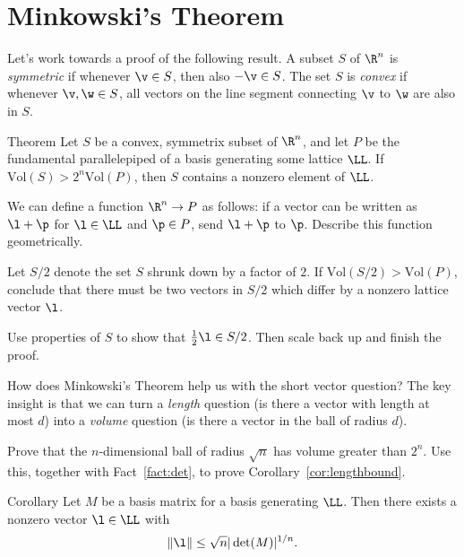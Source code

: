 \section*{Minkowski's Theorem}

Let's work towards a proof of the following result. A subset $S$ of $\R^n$ is \emph{symmetric} if whenever $\v\in S$, then also $-\v\in S$. The set $S$ is \emph{convex} if whenever $\v,\w\in S$, all vectors on the line segment connecting $\v$ to $\w$ are also in $S$.

\begin{toprove}{Theorem}\label{thm:minkowski}
	Let $S$ be a convex, symmetrix subset of $\R^n$, and let $P$ be the fundamental parallelepiped of a basis generating some lattice $\LL$. If $\text{Vol}(S)>2^n\text{Vol}(P)$, then $S$ contains a nonzero element of $\LL$.
\end{toprove}

\begin{explor}
	We can define a function $\R^n\to P$ as follows: if a vector can be written as $\l+\p$ for $\l\in\LL$ and $\p\in P$, send $\l+\p$ to $\p$. Describe this function geometrically.
\end{explor}

\begin{explor}
	Let $S/2$ denote the set $S$ shrunk down by a factor of $2$. If $\text{Vol}(S/2)>\text{Vol}(P)$, conclude that there must be two vectors in $S/2$ which differ by a nonzero lattice vector $\l$.
\end{explor}

\begin{explor}
	Use properties of $S$ to show that $\frac12\l\in S/2$. Then scale back up and finish the proof. 
\end{explor}

How does Minkowski's Theorem help us with the short vector question? The key insight is that we can turn a \emph{length} question (is there a vector with length at most $d$) into a \emph{volume} question (is there a vector in the ball of radius $d$). 

\begin{explor}
	Prove that the $n$-dimensional ball of radius $\sqrt{n}$ has volume greater than $2^n$. Use this, together with Fact~\ref{fact:det}, to prove Corollary~\ref{cor:lengthbound}.
\end{explor}

\begin{toprove}[\color{white}(of Theorem~{\hypersetup{linkcolor=white}\ref{thm:minkowski}})]{Corollary}\label{cor:lengthbound}
	Let $M$ be a basis matrix for a basis generating $\LL$. Then there exists a nonzero vector $\l\in\LL$ with
	\[\|\l\|\leq \sqrt{n}|\det(M)|^{1/n}.\]
\end{toprove}

